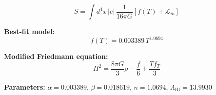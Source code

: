 
\begin{equation}
  S = \int d^4x \, |e| \, \frac{1}{16\pi G} \left[ f(T) + \mathcal{L}_m \right]
\end{equation}

\textbf{Best-fit model:}
\begin{equation}
  f(T) = 0.003389 \, T^{1.0694}
\end{equation}

\textbf{Modified Friedmann equation:}
\begin{equation}
  H^2 = \frac{8\pi G}{3} \rho - \frac{f}{6} + \frac{T f_T}{3}
\end{equation}

\textbf{Parameters:}
$\alpha = 0.003389$, \quad
$\beta = 0.018619$, \quad
$n = 1.0694$, \quad
$\Lambda_{\text{BI}} = 13.9930$